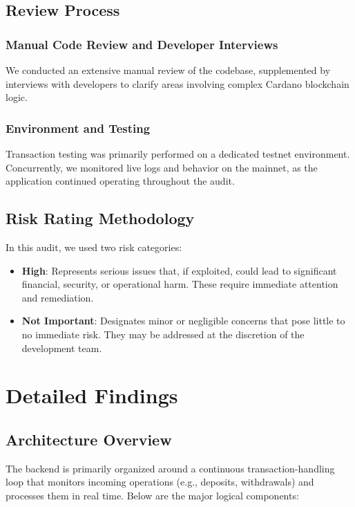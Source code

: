 \documentclass[11pt,a4paper]{article}
\begin{document}
\subsection{Review Process}
\subsubsection{Manual Code Review and Developer Interviews}
We conducted an extensive manual review of the codebase, supplemented by interviews with developers to clarify areas involving complex Cardano blockchain logic.

\subsubsection{Environment and Testing}
Transaction testing was primarily performed on a dedicated testnet environment. Concurrently, we monitored live logs and behavior on the mainnet, as the application continued operating throughout the audit.

\subsection{Risk Rating Methodology}
In this audit, we used two risk categories:
\begin{itemize}
    \item \textbf{\textcolor{danzoRed}{High}}: Represents serious issues that, if exploited, could lead to significant financial, security, or operational harm. These require immediate attention and remediation.
    \item \textbf{\textcolor{danzoGray}{Not Important}}: Designates minor or negligible concerns that pose little to no immediate risk. They may be addressed at the discretion of the development team.
\end{itemize}

\section{Detailed Findings}

\subsection{Architecture Overview}
The backend is primarily organized around a continuous transaction-handling loop that monitors incoming operations (e.g., deposits, withdrawals) and processes them in real time. Below are the major logical components:
\end{document}
